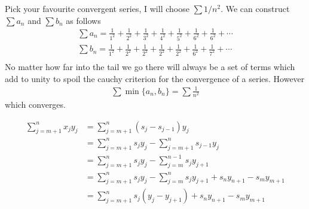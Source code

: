 Pick your favourite convergent series, I will choose $\sum 1/n^2$.
We can construct $\sum a_n$ and $\sum b_n$ as follows 
\begin{gather*}
    \sum a_n = \frac{1}{1^2} + \frac{1}{2^2} + \frac{1}{3^2} + \frac{1}{4^2} + \frac{1}{5^2} + \frac{1}{6^2} + \frac{1}{6^2} + \cdots\\
    \sum b_n = \frac{1}{1^2} + \frac{1}{2^2} + \frac{1}{2^2} + \frac{1}{2^2} + \frac{1}{2^2} + \frac{1}{6^2} + \frac{1}{7^2} + \cdots \\
\end{gather*}
No matter how far into the tail we go there will always be a set of terms which add to unity
to spoil the cauchy criterion for the convergence of a series.
However 
\begin{align*}
    \sum \min\{ a_n, b_n \} = \sum \frac{1}{n^2}
\end{align*}
which converges.

\begin{align*}
    \sum_{j=m+1}^{n} x_j y_j &= \sum_{j=m+1}^{n} (s_j - s_{j-1}) y_j \\
     &= \sum_{j=m+1}^{n} s_j y_j - \sum_{j=m+1}^{n} s_{j-1} y_j \\
     &= \sum_{j=m+1}^{n} s_j y_j - \sum_{j=m}^{n-1} s_{j} y_{j+1} \\
     &= \sum_{j=m+1}^{n} s_j y_j - \sum_{j=m}^{n} s_{j} y_{j+1} + s_ny_{n+1} -  s_m y_{m+1}\\
     &= \sum_{j=m+1}^{n} s_j (y_j - y_{j+1}) + s_ny_{n+1}-  s_m y_{m+1}
\end{align*}

